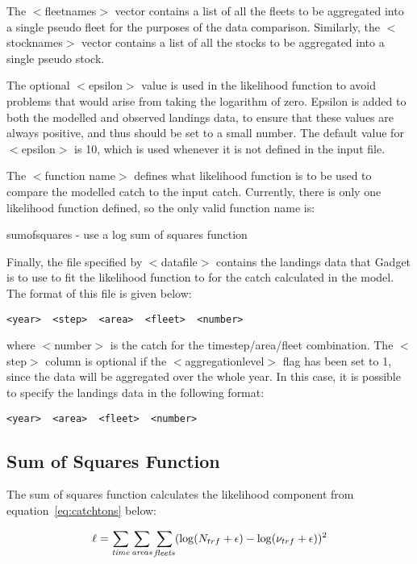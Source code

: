 \documentclass[10pt,twoside]{book}
\begin{document}
\bigskip
The $<$fleetnames$>$ vector contains a list of all the fleets to be aggregated into a single pseudo fleet for the purposes of the data comparison.  Similarly, the $<$stocknames$>$ vector contains a list of all the stocks to be aggregated into a single pseudo stock.

\bigskip
The optional $<$epsilon$>$ value is used in the likelihood function to avoid problems that would arise from taking the logarithm of zero.  Epsilon is added to both the modelled and observed landings data, to ensure that these values are always positive, and thus should be set to a small number.  The default value for $<$epsilon$>$ is 10, which is used whenever it is not defined in the input file.

\bigskip
The $<$function name$>$ defines what likelihood function is to be used to compare the modelled catch to the input catch.  Currently, there is only one likelihood function defined, so the only valid function name is:

\bigskip
sumofsquares - use a log sum of squares function

\bigskip
Finally, the file specified by $<$datafile$>$ contains the landings data that Gadget is to use to fit the likelihood function to for the catch calculated in the model.  The format of this file is given below:

{\small\begin{verbatim}
<year>  <step>  <area>  <fleet>  <number>
\end{verbatim}}

where $<$number$>$ is the catch for the timestep/area/fleet combination.  The $<$step$>$ column is optional if the $<$aggregationlevel$>$ flag has been set to 1, since the data will be aggregated over the whole year.  In this case, it is possible to specify the landings data in the following format:

{\small\begin{verbatim}
<year>  <area>  <fleet>  <number>
\end{verbatim}}

\subsection{Sum of Squares Function}
The sum of squares function calculates the likelihood component from equation~\ref{eq:catchtons} below:

\begin{equation}\label{eq:catchtons}
\ell = \sum_{\it time}\sum_{\it areas}\sum_{\it fleets} (\log(N_{trf} + \epsilon) - \log(\nu_{trf} + \epsilon))^2
\end{equation}
\end{document}
